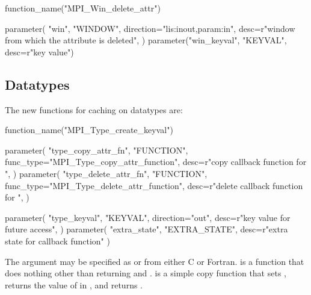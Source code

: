 %
\begin{mpi-binding}
    function_name("MPI_Win_delete_attr")
    
    parameter(
        "win",
        "WINDOW",
        direction="lis:inout,param:in",
        desc=r"window from which the attribute is deleted",
    )
    parameter("win_keyval", "KEYVAL", desc=r"key value")
\end{mpi-binding}

\subsection{Datatypes}
\label{subsec:caching:datatypes}

The new functions for caching on datatypes are:

\begin{mpi-binding}
    function_name("MPI_Type_create_keyval")
    
    parameter(
        "type_copy_attr_fn",
        "FUNCTION",
        func_type="MPI_Type_copy_attr_function",
        desc=r"copy callback function for ",
    )
    parameter(
        "type_delete_attr_fn",
        "FUNCTION",
        func_type="MPI_Type_delete_attr_function",
        desc=r"delete callback function for ",
    )
    
    parameter(
        "type_keyval",
        "KEYVAL",
        direction="out",
        desc=r"key value for future access",
    )
    parameter(
        "extra_state", "EXTRA_STATE", desc=r"extra state for callback function"
    )
\end{mpi-binding}

The argument  may be specified as
 or
from either C or Fortran.
is a function that does nothing other than returning 
and .
 is a simple
copy function that sets ,
returns the value of
 in , and
returns .

